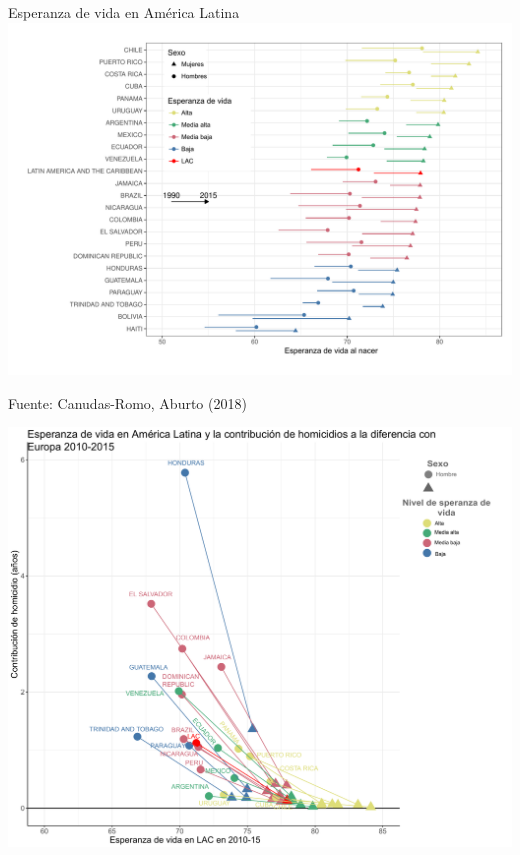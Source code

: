 \documentclass[xcolor={dvipsnames}]{beamer}
\begin{document}
\begin{frame}
\Large{
				\begin{center}
				Esperanza de vida en Am\'erica Latina
\includegraphics[scale=.4]{Figures/Fig1_V4}
				\end{center}				
}
\vspace{-2em}\tiny{Fuente: Canudas-Romo, Aburto (2018)}		
\end{frame}


\begin{frame}
\Large{
				\begin{center}
\includegraphics[scale=.31]{Figures/Fig2_V4}
				\end{center}				
}
\end{frame}
\end{document}
